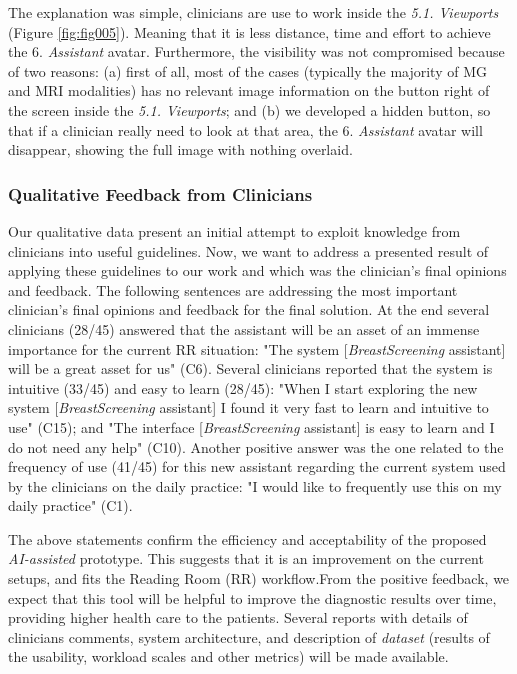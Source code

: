 The explanation was simple, clinicians are use to work inside the {\it 5.1. Viewports} (Figure \ref{fig:fig005}).
Meaning that it is less distance, time and effort to achieve the {6. \it Assistant} avatar.
Furthermore, the visibility was not compromised because of two reasons: (a) first of all, most of the cases (typically the majority of MG and MRI modalities) has no relevant image information on the button right of the screen inside the {\it 5.1. Viewports}; and (b) we developed a hidden button, so that if a clinician really need to look at that area, the {6. \it Assistant} avatar will disappear, showing the full image with nothing overlaid.

\subsubsection{Qualitative Feedback from Clinicians}

Our qualitative data present an initial attempt to exploit knowledge from clinicians into useful guidelines.
Now, we want to address a presented result of applying these guidelines to our work and which was the clinician's final opinions and feedback.
The following sentences are addressing the most important clinician's final opinions and feedback for the final solution.
At the end several clinicians (28/45) answered that the assistant will be an asset of an immense importance for the current RR situation:
"The system [{\it BreastScreening} assistant] will be a great asset for us" (C6).
Several clinicians reported that the system is intuitive (33/45) and easy to learn (28/45):
"When I start exploring the new system [{\it Breast\-Screening} assistant] I found it very fast to learn and intuitive to use" (C15); and
"The interface [{\it BreastScreening} assistant] is easy to learn and I do not need any help" (C10).
Another positive answer was the one related to the frequency of use (41/45) for this new assistant regarding the current system used by the clinicians on the daily practice:
"I would like to frequently use this on my daily practice" (C1).

The above statements confirm the efficiency and acceptability of the proposed {\it AI-assisted} prototype.
This suggests that it is an improvement on the current setups, and fits the Reading Room (RR) workflow.\footnotemark[19]
From the positive feedback, we expect that this tool will be helpful to improve the diagnostic results over time, providing higher health care to the patients.
Several reports with details of clinicians comments, system architecture, and description of {\it dataset} (results of the usability, workload scales and other metrics) will be made available.

